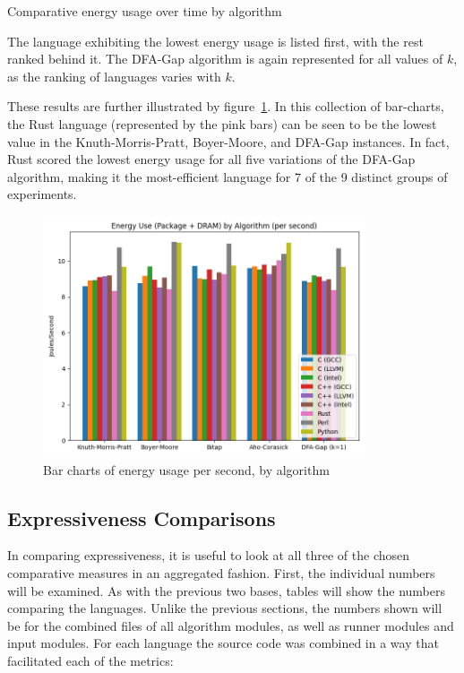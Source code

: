\begin{table}[!htb]

\caption{Comparative energy usage over time by algorithm}
\label{table:energy:comparative-algorithm}
\end{table}

The language exhibiting the lowest energy usage is listed first, with the rest ranked behind it. The DFA-Gap algorithm is again represented for all values of $k$, as the ranking of languages varies with $k$.

These results are further illustrated by figure~\ref{fig:graph:power_per_sec}. In this collection of bar-charts, the Rust language (represented by the pink bars) can be seen to be the lowest value in the Knuth-Morris-Pratt, Boyer-Moore, and DFA-Gap instances. In fact, Rust scored the lowest energy usage for all five variations of the DFA-Gap algorithm, making it the most-efficient language for 7 of the 9 distinct groups of experiments.

\begin{figure}
	\centering
	\includegraphics[width=0.85\textwidth]{figures/power_per_sec.png}
	\caption{Bar charts of energy usage per second, by algorithm}
	\label{fig:graph:power_per_sec}
\end{figure}

\subsection{Expressiveness Comparisons}
\label{subsec:expr_comp}

In comparing expressiveness, it is useful to look at all three of the chosen comparative measures in an aggregated fashion. First, the individual numbers will be examined. As with the previous two bases, tables will show the numbers comparing the languages. Unlike the previous sections, the numbers shown will be for the combined files of all algorithm modules, as well as runner modules and input modules. For each language the source code was combined in a way that facilitated each of the metrics:


